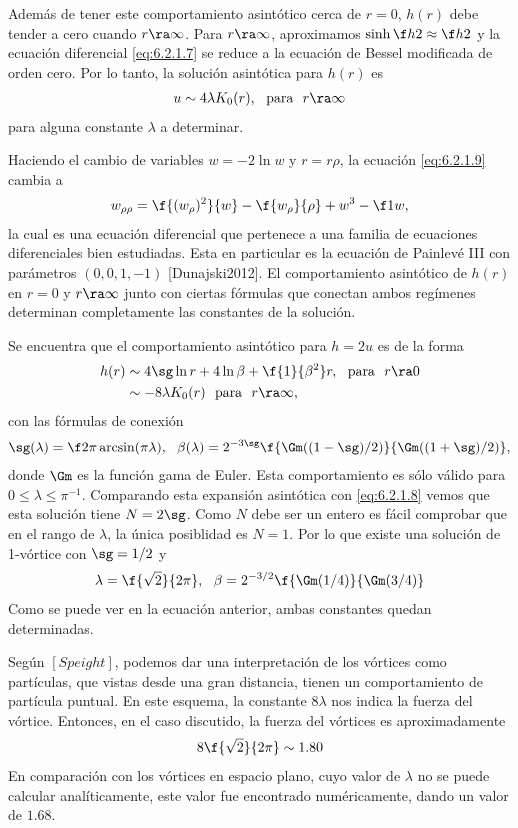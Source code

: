 Además de tener este comportamiento asintótico cerca de $r=0$, $h(r)$ debe tender a cero cuando $r\ra\infty$. 
Para $r\ra\infty$, aproximamos $\sinh\f h2\approx \f h2$ y la ecuación diferencial \eqref{eq:6.2.1.7} se reduce a la ecuación de Bessel modificada de orden cero. Por lo tanto, la solución asintótica para $h(r)$ es
\begin{align}
	u\sim 4\lambda K_0(r), \ \ \text{para} \ \ r\ra\infty
\end{align}
para alguna constante $\lambda$ a determinar. 

Haciendo el cambio de variables $w=-2\ln w$ y $r=r\rho$, la ecuación \eqref{eq:6.2.1.9} cambia a 
\begin{align}
	w_{\rho\rho} = \f{(w_\rho)^2}{w}-\f{w_\rho}{\rho}+w^3-\f 1w,
\end{align}
la cual es una ecuación diferencial que pertenece a una familia de ecuaciones diferenciales bien estudiadas. Esta en particular es la ecuación de Painlevé III con parámetros $(0,0,1,-1)$ [Dunajski2012]. El comportamiento asintótico de $h(r)$ en $r=0$ y $r\ra\infty$ junto con ciertas fórmulas que conectan ambos regímenes determinan completamente las constantes de la solución. 

Se encuentra que el comportamiento asintótico para $h=2u$ es de la forma
\begin{align}
	h(r)&\sim 4\sg\ln r+4\ln\beta+\f{1}{\beta^2}r, \ \ \text{para} \ \ r\ra 0 \label{eq:6.2.1.12}\\
	&\sim -8\lambda K_0(r) \ \ \text{para} \ \ r\ra\infty, \label{eq:6.2.1.13}
\end{align}
con las fórmulas de conexión
\begin{align}
	\sg(\lambda) = \f 2\pi\arcsin(\pi\lambda), \ \ \beta(\lambda) = 2^{-3\sg}\f{\Gm((1-\sg)/2)}{\Gm((1+\sg)/2)},
\end{align}
donde $\Gm$ es la función gama de Euler. Esta comportamiento es sólo válido para $0\leq\lambda\leq\pi^{-1}$. Comparando esta expansión asintótica con \eqref{eq:6.2.1.8} vemos que esta solución tiene $N=2\sg$. Como $N$ debe ser un entero es fácil comprobar que en el rango de $\lambda$, la única posiblidad es $N=1$. Por lo que existe una solución de 1-vórtice con $\sg=1/2$ y
\begin{align}
	\lambda = \f{\sqrt{2}}{2\pi}, \ \ \beta = 2^{-3/2}\f{\Gm(1/4)}{\Gm(3/4)}
\end{align}
Como se puede ver en la ecuación anterior, ambas constantes quedan determinadas.

Según $[Speight]$, podemos dar una interpretación de los vórtices como partículas, que vistas desde una gran distancia, tienen un comportamiento de partícula puntual. En este esquema, la constante $8\lambda$ nos indica la fuerza del vórtice. Entonces, en el caso discutido, la fuerza del vórtices es aproximadamente
\begin{align}
	8\f{\sqrt{2}}{2\pi}\sim 1.80
\end{align}
En comparación con los vórtices en espacio plano, cuyo valor de $\lambda$ no se puede calcular analíticamente, este valor fue encontrado numéricamente, dando un valor de $1.68$.

